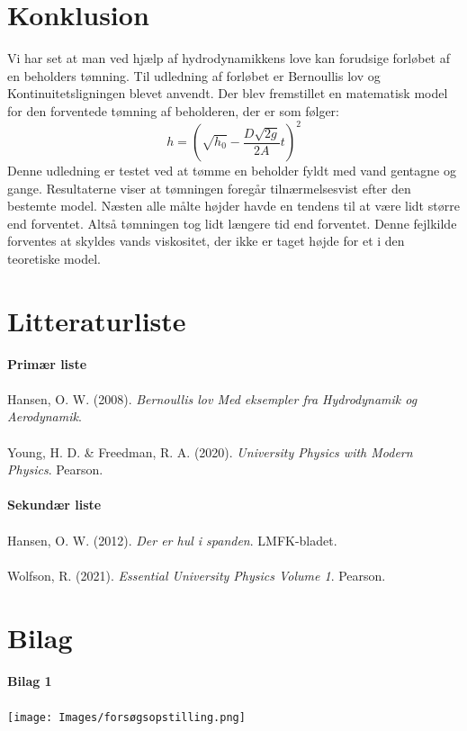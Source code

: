 \documentclass[a4paper, 11pt]{article}
\begin{document}
\section{Konklusion}
Vi har set at man ved hjælp af hydrodynamikkens love kan forudsige forløbet af en beholders tømning. 
Til udledning af forløbet er Bernoullis lov og Kontinuitetsligningen blevet anvendt. Der blev fremstillet en matematisk model 
for den forventede tømning af beholderen, der er som følger:
\[h=\left(\sqrt{h_0}-\frac{D\sqrt{2g}}{2A}t\right)^2\]
Denne udledning er testet ved at tømme en beholder fyldt med vand gentagne og gange. 
Resultaterne viser at tømningen foregår tilnærmelsesvist efter den bestemte model. 
Næsten alle målte højder havde en tendens til at være lidt større end forventet. 
Altså tømningen tog lidt længere tid end forventet. Denne fejlkilde forventes at skyldes vands viskositet, der ikke er taget højde for et i den teoretiske model.\\
\clearpage
\section{Litteraturliste}
\textbf{Primær liste}\\\\
Hansen, O. W. (2008). \textit{Bernoullis lov Med eksempler fra Hydrodynamik og Aerodynamik}.\\\\
Young, H. D. \& Freedman, R. A. (2020). \textit{University Physics with Modern Physics}. Pearson.\\\\
\textbf{Sekundær liste}\\\\
Hansen, O. W. (2012). \textit{Der er hul i spanden}. LMFK-bladet.\\\\
Wolfson, R. (2021). \textit{Essential University Physics Volume 1}. Pearson.
\clearpage
\section{Bilag}
\textbf{Bilag 1}\\\\
\texttt{[image: Images/forsøgsopstilling.png]}
\end{document}
